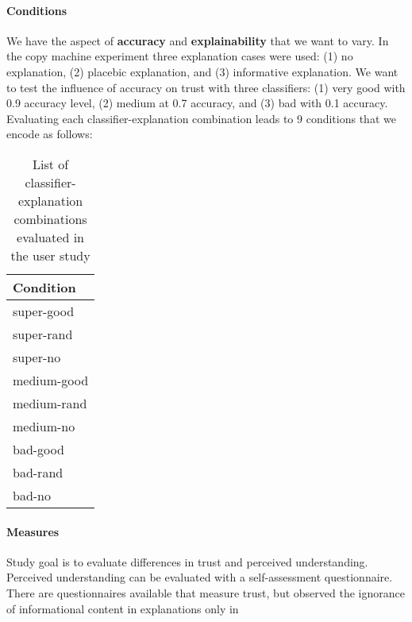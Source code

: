 \paragraph{Conditions}
We have the aspect of \textbf{accuracy} and \textbf{explainability} that we want to vary. In the copy machine experiment \cite{langer1978mindlessness} three explanation cases were used: (1) no explanation, (2) placebic explanation, and (3) informative explanation. We want to test the influence of accuracy on trust with three classifiers: (1) very good with 0.9 accuracy level, (2) medium at 0.7 accuracy, and (3) bad with 0.1 accuracy. Evaluating each classifier-explanation combination leads to 9 conditions that we encode as follows:
\begin{table}
	\begin{tabular}{l}
		\textbf{Condition}\\ \midrule
		super-good\\
		super-rand\\
		super-no\\
		medium-good\\
		medium-rand\\
		medium-no\\
		bad-good\\
		bad-rand\\
		bad-no\\ \bottomrule
	\end{tabular}
	\caption{List of classifier-explanation combinations evaluated in the user study}
	\label{tab:conditions}
\end{table}

\paragraph{Measures}
Study goal is to evaluate differences in trust and perceived understanding.\newline
Perceived understanding can be evaluated with a self-assessment questionnaire.\newline
There are questionnaires available that measure trust, but \cite{langer1978mindlessness} observed the ignorance of informational content in explanations only in 







